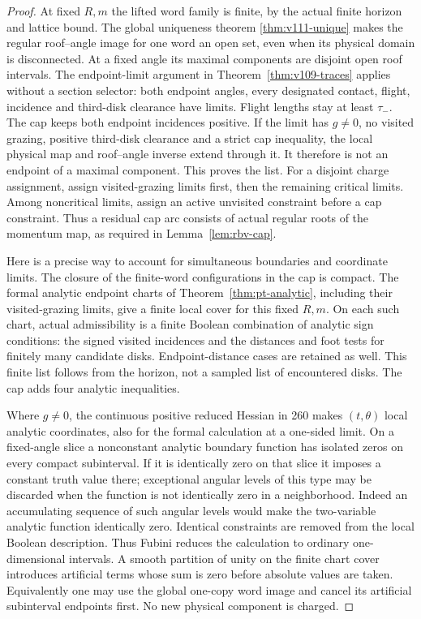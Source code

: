 \begin{proof}
At fixed $R,m$ the lifted word family is finite, by the actual
finite horizon and lattice bound.  The global uniqueness theorem
\ref{thm:v111-unique} makes the regular roof--angle image for one
word an open set, even when its physical domain is disconnected.
At a fixed angle its maximal components are disjoint open roof
intervals.  The endpoint-limit argument in
Theorem~\ref{thm:v109-traces} applies without a section selector:
both endpoint angles, every designated contact, flight, incidence
and third-disk clearance have limits.  Flight lengths stay at
least $\tau_-$.  The cap keeps both endpoint incidences positive.
If the limit has $g\ne0$, no visited grazing, positive third-disk
clearance and a strict cap inequality, the local physical map and
roof--angle inverse extend through it.  It therefore is not an
endpoint of a maximal component.  This proves the list.  For a
disjoint charge assignment, assign visited-grazing limits first,
then the remaining critical limits.  Among noncritical limits,
assign an active unvisited constraint before a cap constraint.
Thus a residual cap arc consists of actual regular roots of the
momentum map, as required in Lemma~\ref{lem:rbv-cap}.

Here is a precise way to account for simultaneous boundaries and
coordinate limits.  The closure of the finite-word configurations
in the cap is compact.  The formal analytic endpoint charts of
Theorem~\ref{thm:pt-analytic}, including their visited-grazing
limits, give a finite local cover for this fixed $R,m$.  On each
such chart, actual admissibility is a finite Boolean combination
of analytic sign conditions: the signed visited incidences and
the distances and foot tests for finitely many candidate disks.
Endpoint-distance cases are retained as well.  This finite list
follows from the horizon, not a sampled list of encountered disks.
The cap adds four analytic inequalities.

Where $g\ne0$, the continuous positive reduced Hessian in 260
makes $(t,\theta)$ local analytic coordinates, also for the formal
calculation at a one-sided limit.  On a fixed-angle slice a
nonconstant analytic boundary function has isolated zeros on
every compact subinterval.  If it is identically zero on that
slice it imposes a constant truth value there; exceptional angular
levels of this type may be discarded when the function is not
identically zero in a neighborhood.  Indeed an accumulating
sequence of such angular levels would make the two-variable
analytic function identically zero.  Identical constraints are
removed from the local Boolean description.  Thus Fubini reduces
the calculation to ordinary one-dimensional intervals.  A smooth
partition of unity on the finite chart cover introduces artificial
terms whose sum is zero before absolute values are taken.  Equivalently
one may use the global one-copy word image and cancel its artificial
subinterval endpoints first.  No new physical component is charged.


\end{proof}
